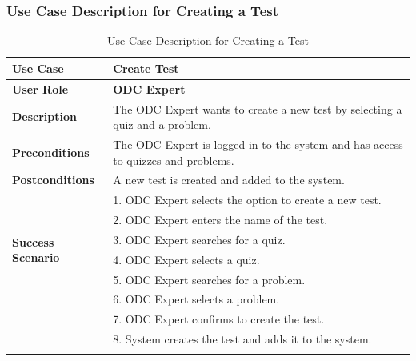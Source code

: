 \subsubsection{Use Case Description for Creating a Test}
\begin{longtable}{|p{3cm}|p{12cm}|}
  \hline
  \rowcolor{green!20} \textbf{Use Case}      & \textbf{Create Test}                                                              \\ \hline
  \textbf{User Role}                         & \textbf{ODC Expert}                                                               \\ \hline
  \textbf{Description}                       & The ODC Expert wants to create a new test by selecting a quiz and a problem.      \\ \hline
  \textbf{Preconditions}                     & The ODC Expert is logged in to the system and has access to quizzes and problems. \\ \hline
  \textbf{Postconditions}                    & A new test is created and added to the system.                                    \\ \hline
  \multirow{6}{*}{\textbf{Success Scenario}} & 1. ODC Expert selects the option to create a new test.                            \\ \cline{2-2}
                                             & 2. ODC Expert enters the name of the test.                                        \\ \cline{2-2}
                                             & 3. ODC Expert searches for a quiz.                                                \\ \cline{2-2}
                                             & 4. ODC Expert selects a quiz.                                                     \\ \cline{2-2}
                                             & 5. ODC Expert searches for a problem.                                             \\ \cline{2-2}
                                             & 6. ODC Expert selects a problem.                                                  \\ \cline{2-2}
                                             & 7. ODC Expert confirms to create the test.                                        \\ \cline{2-2}
                                             & 8. System creates the test and adds it to the system.                             \\ \hline
  \caption{Use Case Description for Creating a Test}\label{tab:create_test_use_case}
\end{longtable}


